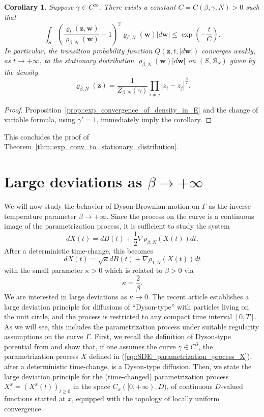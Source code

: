 \documentclass[11pt]{article}
\numberwithin{equation}{section}
\newtheorem{corollary}{Corollary}[theorem]
\theoremstyle{definition}
\begin{document}
\begin{corollary}\label{cor::exp_convergence_process_on_Gamma}
Suppose $\gamma \in C^{\infty}$. There exists a constant $C=C(\beta,\gamma,N)>0$ such that 
\[
    \int_{S}\left(\frac{\varrho_{t}(\boldsymbol{z},\boldsymbol{w})}{\varrho_{\beta,N}(\boldsymbol{w})}-1\right)^2\varrho_{\beta,N}(\boldsymbol{w}) |d\boldsymbol{w}| 
    \le \exp\left(-\frac{t}{C}\right).
\]
In particular, the transition probability function $Q(\boldsymbol{z}, t, |d\boldsymbol{w}|)$ converges weakly, as $t\to+\infty$, to the stationary distribution $\varrho_{\beta,N}(\boldsymbol{w})|d\boldsymbol{w}|$ on $(S, \mathcal{B}_{S})$ given by the density 
\[
    \varrho_{\beta,N}(\boldsymbol{z}) 
    = \frac{1}{Z_{\beta, N}(\gamma)}\prod_{i\neq j}|z_{i}-z_{j}|^{\frac{\beta}{2}}.
\]
\end{corollary}
\begin{proof}
Proposition~\ref{prop::exp_convergence_of_density_in_E} and the change of variable formula, using $\gamma'=1$, immediately imply the corollary.\qedhere
\end{proof}
\noindent This concludes the proof of Theorem~\ref{thm::exp_conv_to_stationary_distribution}.

\section{Large deviations as \texorpdfstring{$\beta \to +\infty$}{β->+∞}}
We will now study the behavior of Dyson Brownian motion on $\Gamma$ as the inverse temperature parameter $\beta\to+\infty$. Since the process on the curve is a continuous image of the parametrization process, it is sufficient to study the system
\[
    dX(t) = dB(t)+\frac{1}{2}\nabla\rho_{\beta,N}(X(t))dt.
\]
After a deterministic time-change, this becomes
\[
    dX(t) = \sqrt{\kappa}dB(t) + \nabla\rho_{1,N}(X(t))dt
\]
with the small parameter $\kappa>0$ which is related to $\beta>0$ via
\[
    \kappa = \frac{2}{\beta}.
\]
We are interested in large deviations as $\kappa  \to 0$.
The recent article \cite{abuzaid2024large} establishes a large deviation principle for diffusions of ``Dyson-type'' with particles living on the unit circle, and the process is restricted to any compact time interval $[0,T]$. As we will see, this includes the parametrization process under suitable regularity assumptions on the curve $\Gamma$. First, we recall the definition of Dyson-type potential from \cite{abuzaid2024large} and show that, if one assumes the curve  $\gamma \in C^3$, the  parametrization process $X$ defined in (\ref{eq::SDE_parametrization_process_X}), after a deterministic time-change, is a Dyson-type diffusion. Then, we state the large deviation principle for the (time-changed) parametrization process $X^{x}=(X^{x}(t))_{t\ge 0}$ in the space $C_{x}([0,+\infty), D)$,  of continuous $D$-valued functions started at $x$, equipped with the topology of locally uniform convergence.
\end{document}
